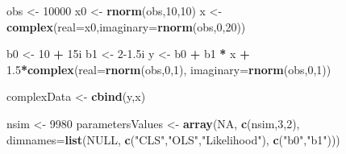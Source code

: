 \documentclass[
]{book}
\newenvironment{Shaded}{\begin{snugshade}}{\end{snugshade}}
\newcommand{\DataTypeTok}[1]{\textcolor[rgb]{0.13,0.29,0.53}{#1}}
\newcommand{\DecValTok}[1]{\textcolor[rgb]{0.00,0.00,0.81}{#1}}
\newcommand{\FloatTok}[1]{\textcolor[rgb]{0.00,0.00,0.81}{#1}}
\newcommand{\KeywordTok}[1]{\textcolor[rgb]{0.13,0.29,0.53}{\textbf{#1}}}
\newcommand{\NormalTok}[1]{#1}
\newcommand{\OperatorTok}[1]{\textcolor[rgb]{0.81,0.36,0.00}{\textbf{#1}}}
\newcommand{\OtherTok}[1]{\textcolor[rgb]{0.56,0.35,0.01}{#1}}
\newcommand{\StringTok}[1]{\textcolor[rgb]{0.31,0.60,0.02}{#1}}
\begin{document}
\begin{Shaded}
\begin{Highlighting}[]
\NormalTok{obs \textless{}{-}}\StringTok{ }\DecValTok{10000}
\NormalTok{x0 \textless{}{-}}\StringTok{ }\KeywordTok{rnorm}\NormalTok{(obs,}\DecValTok{10}\NormalTok{,}\DecValTok{10}\NormalTok{)}
\NormalTok{x \textless{}{-}}\StringTok{ }\KeywordTok{complex}\NormalTok{(}\DataTypeTok{real=}\NormalTok{x0,}\DataTypeTok{imaginary=}\KeywordTok{rnorm}\NormalTok{(obs,}\DecValTok{0}\NormalTok{,}\DecValTok{20}\NormalTok{))}

\NormalTok{b0 \textless{}{-}}\StringTok{ }\DecValTok{10} \OperatorTok{+}\StringTok{ }\NormalTok{15i}
\NormalTok{b1 \textless{}{-}}\StringTok{ }\DecValTok{2}\FloatTok{{-}1.5}\NormalTok{i}
\NormalTok{y \textless{}{-}}\StringTok{ }\NormalTok{b0 }\OperatorTok{+}\StringTok{ }\NormalTok{b1 }\OperatorTok{*}\StringTok{ }\NormalTok{x }\OperatorTok{+}\StringTok{ }\FloatTok{1.5}\OperatorTok{*}\KeywordTok{complex}\NormalTok{(}\DataTypeTok{real=}\KeywordTok{rnorm}\NormalTok{(obs,}\DecValTok{0}\NormalTok{,}\DecValTok{1}\NormalTok{),}
                               \DataTypeTok{imaginary=}\KeywordTok{rnorm}\NormalTok{(obs,}\DecValTok{0}\NormalTok{,}\DecValTok{1}\NormalTok{))}

\NormalTok{complexData \textless{}{-}}\StringTok{ }\KeywordTok{cbind}\NormalTok{(y,x)}

\NormalTok{nsim \textless{}{-}}\StringTok{ }\DecValTok{9980}
\NormalTok{parametersValues \textless{}{-}}
\StringTok{    }\KeywordTok{array}\NormalTok{(}\OtherTok{NA}\NormalTok{, }\KeywordTok{c}\NormalTok{(nsim,}\DecValTok{3}\NormalTok{,}\DecValTok{2}\NormalTok{),}
          \DataTypeTok{dimnames=}\KeywordTok{list}\NormalTok{(}\OtherTok{NULL}\NormalTok{,}
                        \KeywordTok{c}\NormalTok{(}\StringTok{"CLS"}\NormalTok{,}\StringTok{"OLS"}\NormalTok{,}\StringTok{"Likelihood"}\NormalTok{),}
                        \KeywordTok{c}\NormalTok{(}\StringTok{"b0"}\NormalTok{,}\StringTok{"b1"}\NormalTok{)))}


\end{Highlighting}
\end{Shaded}
\end{document}
